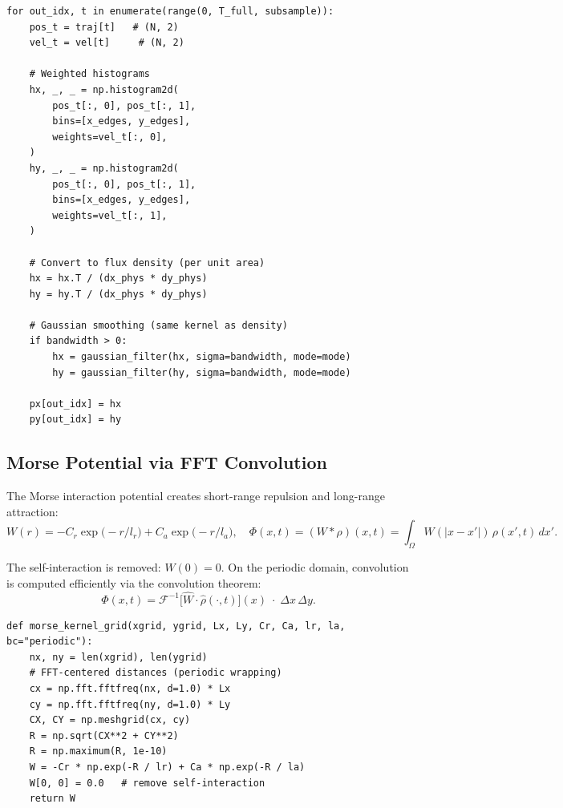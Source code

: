 \documentclass[11pt]{article}
\begin{document}
\begin{lstlisting}[caption={fields.py --- compute\_flux\_kde (key loop)}]
for out_idx, t in enumerate(range(0, T_full, subsample)):
    pos_t = traj[t]   # (N, 2)
    vel_t = vel[t]     # (N, 2)

    # Weighted histograms
    hx, _, _ = np.histogram2d(
        pos_t[:, 0], pos_t[:, 1],
        bins=[x_edges, y_edges],
        weights=vel_t[:, 0],
    )
    hy, _, _ = np.histogram2d(
        pos_t[:, 0], pos_t[:, 1],
        bins=[x_edges, y_edges],
        weights=vel_t[:, 1],
    )

    # Convert to flux density (per unit area)
    hx = hx.T / (dx_phys * dy_phys)
    hy = hy.T / (dx_phys * dy_phys)

    # Gaussian smoothing (same kernel as density)
    if bandwidth > 0:
        hx = gaussian_filter(hx, sigma=bandwidth, mode=mode)
        hy = gaussian_filter(hy, sigma=bandwidth, mode=mode)

    px[out_idx] = hx
    py[out_idx] = hy
\end{lstlisting}


\subsection{Morse Potential via FFT Convolution}

The Morse interaction potential creates short-range repulsion and
long-range attraction:
\begin{equation}
  W(r) = -C_r \exp\!\bigl(-r/l_r\bigr) + C_a \exp\!\bigl(-r/l_a\bigr),
  \quad
  \Phi(x,t) = (W * \rho)(x,t) = \int_\Omega W(|x - x'|)\,\rho(x',t)\,dx'.
\end{equation}

The self-interaction is removed: $W(0) = 0$.
On the periodic domain, convolution is computed efficiently via the
convolution theorem:
\begin{equation}
  \Phi(x,t) = \mathcal{F}^{-1}\!\bigl[\hat{W}\cdot\hat{\rho}(\cdot,t)\bigr](x)
  \;\cdot\;\Delta x\,\Delta y.
\end{equation}

\begin{lstlisting}[caption={fields.py --- Morse kernel construction}]
def morse_kernel_grid(xgrid, ygrid, Lx, Ly, Cr, Ca, lr, la, bc="periodic"):
    nx, ny = len(xgrid), len(ygrid)
    # FFT-centered distances (periodic wrapping)
    cx = np.fft.fftfreq(nx, d=1.0) * Lx
    cy = np.fft.fftfreq(ny, d=1.0) * Ly
    CX, CY = np.meshgrid(cx, cy)
    R = np.sqrt(CX**2 + CY**2)
    R = np.maximum(R, 1e-10)
    W = -Cr * np.exp(-R / lr) + Ca * np.exp(-R / la)
    W[0, 0] = 0.0   # remove self-interaction
    return W
\end{lstlisting}
\end{document}
